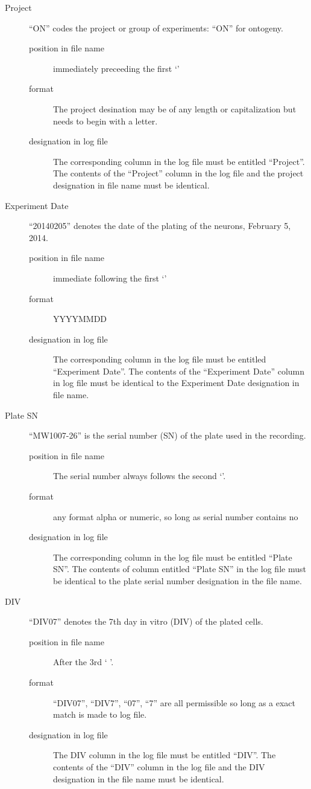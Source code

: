 \documentclass{article}\usepackage[]{graphicx}\usepackage[]{color}
\begin{document}
\begin{description}

\item[Project] ``ON'' codes the project or group of experiments: ``ON'' for ontogeny. 
\begin{description}
\item[position in file name] immediately preceeding the first `\textunderscore '
\item[format] The project desination may be of any length or capitalization but needs to begin with a letter.
\item[designation in log file] The corresponding column in the log file must be entitled ``Project''. The contents of the ``Project'' column in the log file and the project designation in file name must be identical.
\end{description}


\item[Experiment Date] ``20140205'' denotes the date of the plating of the neurons, February 5, 2014. 
\begin{description}
\item[position in file name] immediate following the first `\textunderscore '
\item[format] YYYYMMDD 
\item[designation in log file] The corresponding column in the log file must be entitled ``Experiment Date''. The contents of the ``Experiment Date'' column in log file must be identical to the Experiment Date designation in file name.
\end{description}


\item[Plate SN ]  ``MW1007-26'' is the serial number (SN) of the plate used in the recording.  
\begin{description}
\item[position in file name] The serial number always follows the second `\textunderscore '.
\item[format] any format alpha or numeric, so long as serial number contains no  \textunderscore
\item[designation in log file] The corresponding column in the log file must be entitled ``Plate SN''. The contents of column entitled ``Plate SN'' in the log file must be identical to the plate serial number designation in the file name.
\end{description}

\item[DIV] ``DIV07'' denotes the 7th day in vitro (DIV) of the plated cells.
\begin{description}
\item[position in file name] After the 3rd ` \textunderscore '.
\item[format]  ``DIV07'', ``DIV7'', ``07'', ``7'' are all permissible so long as a exact match is made to log file.
\item[designation in log file] The DIV column in the log file must be entitled ``DIV''. The contents of the ``DIV'' column in the log file and the DIV designation in the file name must be identical.
\end{description}


\end{description}
\end{document}
